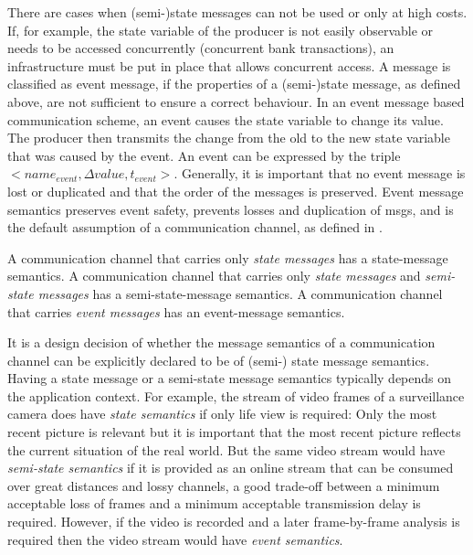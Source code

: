 There are cases when (semi-)state messages can not be used or only at high costs.
If, for example, the state variable of the producer is not easily observable or needs to be accessed concurrently (\eg concurrent bank transactions), an infrastructure must be put in place that allows concurrent access.
A message is classified as event message, if the properties of a (semi-)state message, as defined above, are not sufficient to ensure a correct behaviour.
In an event message based communication scheme, an event causes the state variable to change its value.
The producer then transmits the change from the old to the new state variable that was caused by the event.
An event can be expressed by the triple $<name_{event}, \Delta value, t_{event}>$.
Generally, it is important that no event message is lost or duplicated and that the order of the messages is preserved.
Event message semantics preserves event safety, \ie prevents losses and duplication of \glspl*{msg}, and is the default assumption of a communication channel, as defined in \Def{\ref{def_channel_msg_semantics}}.
\begin{definition}
\label{def_channel_msg_semantics}
A communication channel that carries only {\em state messages} has a state-message semantics.
A communication channel that carries only {\em state messages} and {\em semi-state messages} has a semi-state-message semantics.
A communication channel that carries {\em event messages} has an event-message semantics.
\end{definition}

It is a design decision of whether the message semantics of a communication channel can be explicitly declared to be of (semi-) state message semantics.
Having a state message or a semi-state message semantics typically depends on the application context.
For example, the stream of video frames of a surveillance camera does have \emph{state semantics} if only life view is required:
Only the most recent picture is relevant but it is important that the most recent picture reflects the current situation of the real world.
But the same video stream would have \emph{semi-state semantics} if it is provided as an online stream that can be consumed over great distances and lossy channels, \ie a good trade-off between a minimum acceptable loss of frames and a minimum acceptable transmission delay is required.
However, if the video is recorded and a later frame-by-frame analysis is required then the video stream would have \emph{event semantics}.

